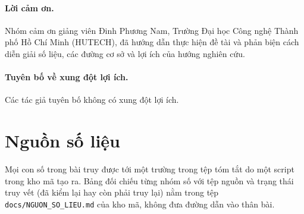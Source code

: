 \documentclass[a4paper,fleqn]{cas-dc}
\begin{document}
\paragraph{Lời cảm ơn.} Nhóm cảm ơn giảng viên Đinh Phương Nam, Trường Đại học Công nghệ Thành phố Hồ Chí Minh (HUTECH), đã hướng dẫn thực hiện đề tài và phản biện cách diễn giải số liệu, các đường cơ sở và lợi ích của hướng nghiên cứu.
\paragraph{Tuyên bố về xung đột lợi ích.} Các tác giả tuyên bố không có xung đột lợi ích.

\appendix
\section{Nguồn số liệu}
\label{app:src}
Mọi con số trong bài truy được tới một trường trong tệp tóm tắt do một script trong kho mã tạo ra. Bảng đối chiếu từng nhóm số với tệp nguồn và trạng thái truy vết (đã kiểm lại hay còn phải truy lại) nằm trong tệp \texttt{docs/NGUON\_SO\_LIEU.md} của kho mã, không đưa đường dẫn vào thân bài.



\end{document}
